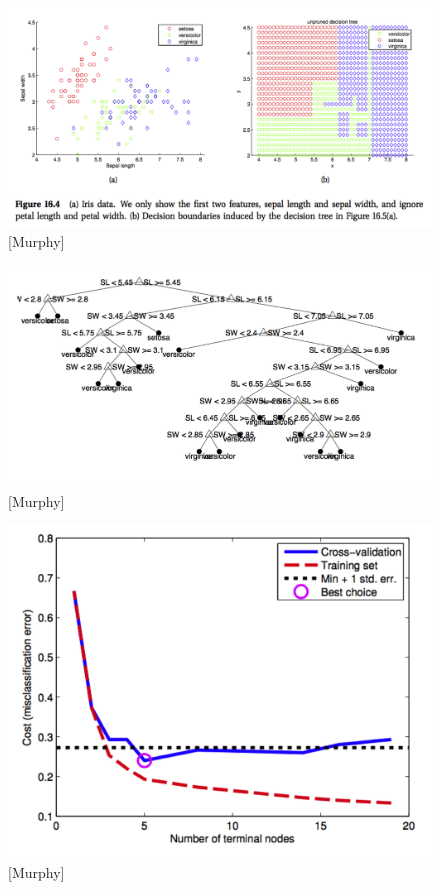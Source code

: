 \documentclass[a4paper]{article}
\begin{document}
\begin{figure}
\centering
\includegraphics[width=1.0\textwidth]{fig16_4.png}
\caption{\label{fig:tree5}[Murphy]}
\end{figure}

\begin{figure}
\centering
\includegraphics[width=1.0\textwidth]{fig16_5a.png}
\caption{\label{fig:tree6}[Murphy]}
\end{figure}

\begin{figure}
\centering
\includegraphics[width=1.0\textwidth]{fig16_5b.png}
\caption{\label{fig:tree7}[Murphy]}
\end{figure}
\end{document}
